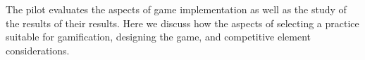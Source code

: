 \documentclass{sig-alternate}
\begin{document}

The pilot evaluates the aspects of game implementation as well as the study of the results of their results. Here we discuss how the aspects of selecting a practice suitable for gamification, designing the game, and competitive element considerations.
\end{document}
